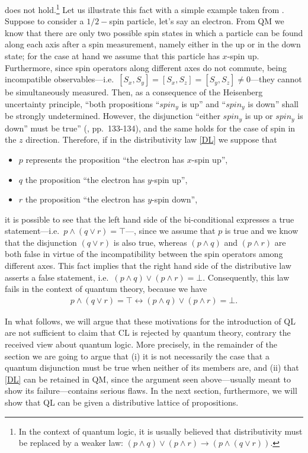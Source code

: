 \documentclass[11pt, executivepaper]{article}
\begin{document}
\noindent does not hold.\footnote{In the context of quantum logic, it is usually believed that distributivity must be replaced by a weaker law: $(p\wedge q)\vee(p\wedge r)\longrightarrow(p\wedge(q\vee r)).$}
Let us illustrate this fact with a simple example taken from \cite{Giuntini:2002}. Suppose to consider a $1/2-$spin particle, let's say an electron. From QM we know that there are only two possible spin states in which a particle can be found along each axis after a spin measurement, namely either in the up or in the down state; for the case at hand we assume that this particle has $x$-spin up. Furthermore, since spin operators along different axes do not commute, being incompatible observables---i.e.\ $[S_x, S_y]=[S_x, S_z]=[S_y, S_z]\neq0$---they cannot be simultaneously measured. Then, as a consequence of the Heisenberg uncertainty principle, ``both propositions ``$spin_y$ is up'' and ``$spin_y$ is down'' shall be strongly undetermined. However, the disjunction ``either $spin_y$ is up or $spin_y$ is down'' must be true'' (\cite{Giuntini:2002}, pp.\ 133-134), and the same holds for the case of spin in the $z$ direction. Therefore, if in the distributivity law \eqref{DL} we suppose that
\begin{itemize}
	\item $p$ represents the proposition ``the electron has $x$-spin up'', 
	\item $q$ the proposition ``the electron has $y$-spin up'',
	\item $r$  the proposition ``the electron has $y$-spin down'',
\end{itemize}
\noindent it is possible to see that the left hand side of the bi-conditional expresses a true statement---i.e.\ $p\wedge(q\vee r)=\top$---, since we assume that $p$ is true and we know that the disjunction $(q\vee r)$ is also true, whereas $(p\wedge q)$ and $(p\wedge r)$ are both false in virtue of the incompatibility between the spin operators among different axes. This fact implies that the right hand side of the distributive law asserts a false statement, i.e.\ $(p\wedge q)\vee(p\wedge r)=\bot$. Consequently, this law fails in the context of quantum theory, because we have 
\begin{align}
\label{contradiction}
p\wedge(q\vee r)=\top\longleftrightarrow(p\wedge q)\vee(p\wedge r)=\bot. 
\end{align}

In what follows, we will argue that these motivations for the introduction of QL are not sufficient to claim that CL is rejected by quantum theory, contrary the received view about quantum logic. More precisely, in the remainder of the section we are going to argue that (i) it is not necessarily the case that a quantum disjunction must be true when neither of its members are, and (ii) that \eqref{DL} can be retained in QM, since the argument seen above---usually meant to show its failure---contains serious flaws. In the next section, furthermore, we will show that QL can be given a distributive lattice of propositions.
\end{document}
